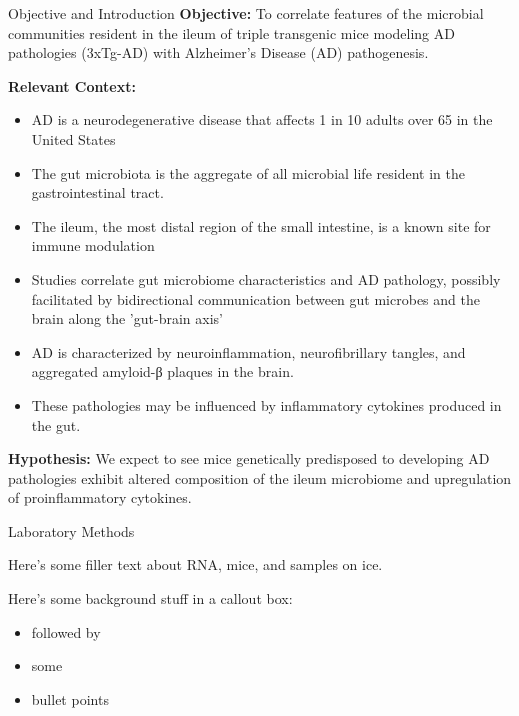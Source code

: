 \documentclass[final]{beamer}
\newlength{\colwidth}
\begin{document}
\begin{frame}[t]
\begin{columns}[t]
\begin{column}{\colwidth}
\begin{block}{Objective and Introduction}
    \textbf{Objective:} To correlate features of the microbial communities
    resident in the ileum of triple transgenic mice modeling AD pathologies
    (3xTg-AD) with Alzheimer's Disease (AD) pathogenesis.

    \textbf{Relevant Context:}
    \begin{itemize}
      \item AD is a neurodegenerative disease that affects 1 in 10 adults over 65 in the United States
      \item The gut microbiota is the aggregate of all microbial life resident in the gastrointestinal tract.
      \item The ileum, the most distal region of the small intestine, is a known site for immune modulation
      \item Studies correlate gut microbiome characteristics and AD pathology, possibly facilitated by bidirectional communication between gut microbes and the brain along the 'gut-brain axis'
      \item AD is characterized by neuroinflammation, neurofibrillary tangles, and aggregated amyloid-β plaques in the brain.
      \item These pathologies may be influenced by inflammatory cytokines produced in the gut.
    \end{itemize}

    \textbf{Hypothesis:}
    We expect to see mice genetically predisposed to developing AD
    pathologies exhibit altered composition of the ileum microbiome and
    upregulation of proinflammatory cytokines.
      
  \end{block}

  \begin{block}{Laboratory Methods}

    Here's some filler text about RNA, mice, and samples on ice.

   \begin{tcolorbox}
   [width=\textwidth, colframe=blue]
   {Here's some background stuff in a callout box:}
    \begin{itemize}
      \item {followed by}
      \item {some}
      \item {bullet points}
    \end{itemize}
    \end{tcolorbox}
  \end{block}


\end{column}
\end{columns}
\end{frame}
\end{document}

